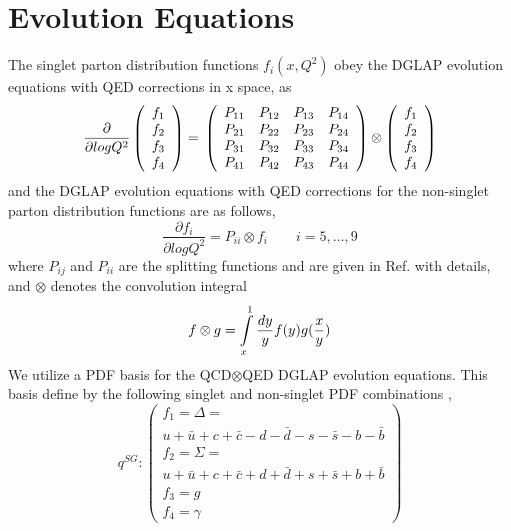 \documentclass[review]{elsarticle}
\begin{document}
\section{Evolution Equations}
The singlet parton distribution functions $f_{i}(x,Q^{2})$ obey the
DGLAP evolution equations with QED corrections \cite{Carrazza:2015dea}
in x space, as
\begin{equation}
\frac{\partial}{\partial logQ^{2}}\left(\begin{array}{c}
f_{1}\\
f_{2}\\
f_{3}\\
f_{4}
\end{array}\right)=\\
\left(\begin{array}{cccc}
P_{11} & P_{12} & P_{13} & P_{14}\\
P_{21} & P_{22} & P_{23} & P_{24}\\
P_{31} & P_{32} & P_{33} & P_{34}\\
P_{41} & P_{42} & P_{43} & P_{44}
\end{array}\right)\otimes\left(\begin{array}{c}
f_{1}\\
f_{2}\\
f_{3}\\
f_{4}
\end{array}\right)\label{eq:1}
\end{equation}
and the DGLAP evolution equations with QED corrections for the non-singlet parton distribution
functions are as follows,
\begin{equation}
\frac{\partial{{f}_{i}}}{\partial log{{Q}^{2}}}={{P}_{ii}}\otimes{{f}_{i}}\qquad i=5,\ldots,9\label{eq:2}
\end{equation}
where $P_{ij}$ and $P_{ii}$ are the splitting functions and are given
in Ref.\cite{Mottaghizadeh:2016krr} with details,
and $\otimes$ denotes the convolution integral
\begin{equation}
f\otimes g=\intop_{x}^{1}\frac{dy}{y}f(y)g(\frac{x}{y})\label{eq:3}
\end{equation}
We utilize a PDF basis for the QCD$\otimes$QED
DGLAP evolution equations. This basis define by the following singlet and non-singlet
PDF combinations \cite{Roth:2004ti},
\begin{equation}
q^{SG}:\left(\begin{array}{c}
{{f}_{1}}=\Delta=\\
u+\bar{u}+c+\bar{c}-d-\bar{d}-s-\bar{s}-b-\bar{b}\\
{{f}_{2}}=\Sigma=\\
u+\bar{u}+c+\bar{c}+d+\bar{d}+s+\bar{s}+b+\bar{b}\\
{{f}_{3}}=g\\
{{f}_{4}}=\gamma
\end{array}\right)\label{eq:4}
\end{equation}
\end{document}
